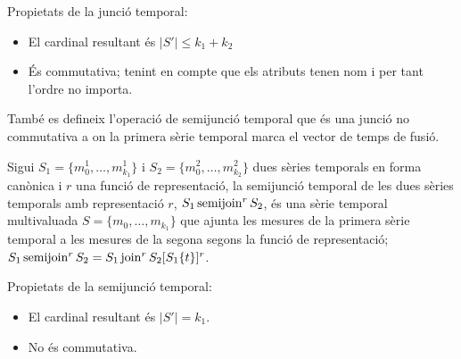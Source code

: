 Propietats de la junció temporal:
\begin{itemize}
\item El cardinal resultant és $|S'| \leq k_1 + k_2$
\item És commutativa; tenint en compte que els atributs tenen nom i
  per tant l'ordre no importa.
\end{itemize}



També es defineix l'operació de semijunció temporal que és una junció
no commutativa a on la primera sèrie temporal marca el vector de temps
de fusió.

\begin{definition}
  Sigui $S_1=\{m_0^1, \dotsc, m_{k_1}^1\}$ i $S_2=\{m_0^2, \dotsc,
  m_{k_2}^2\}$ dues sèries temporals en forma canònica i $r$ una
  funció de representació, la semijunció temporal de les dues sèries
  temporals amb representació $r$, $S_1 \operatorname*{semijoin}^r S_2$, és una sèrie
  temporal multivaluada $S=\{m_0, \dotsc, m_{k_1}\}$ que ajunta les
  mesures de la primera sèrie temporal a les mesures de la segona
  segons la funció de representació; $S_1 \operatorname*{semijoin}^r S_2 = S_1
  \operatorname*{join}^r S_2[S_1\{t\}]^r$.
\end{definition}


Propietats de la semijunció temporal:
\begin{itemize}
\item El cardinal resultant és $|S'| = k_1$.
\item No és commutativa.
\end{itemize}

















